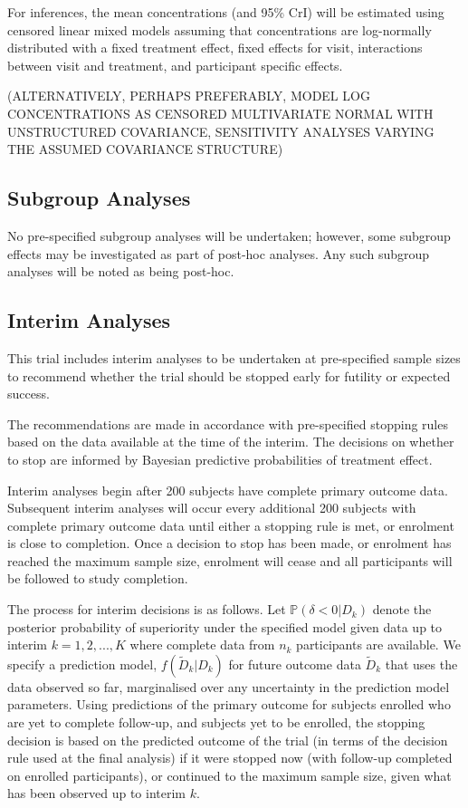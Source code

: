 \documentclass{bmcart}
\begin{document}
For inferences, the mean concentrations (and 95\% CrI) will be estimated using censored linear mixed models assuming that concentrations are log-normally distributed with a fixed treatment effect, fixed effects for visit, interactions between visit and treatment, and participant specific effects.

(ALTERNATIVELY, PERHAPS PREFERABLY, MODEL LOG CONCENTRATIONS AS CENSORED MULTIVARIATE NORMAL WITH UNSTRUCTURED COVARIANCE, SENSITIVITY ANALYSES VARYING THE ASSUMED COVARIANCE STRUCTURE)


\subsection*{Subgroup Analyses}

No pre-specified subgroup analyses will be undertaken; however, some subgroup effects may be investigated as part of post-hoc analyses.
Any such subgroup analyses will be noted as being post-hoc.

\subsection*{Interim Analyses}

This trial includes interim analyses to be undertaken at pre-specified sample sizes to recommend whether the trial should be stopped early for futility or expected success.

The recommendations are made in accordance with pre-specified stopping rules based on the data available at the time of the interim.
The decisions on whether to stop are informed by Bayesian predictive probabilities of treatment effect.

Interim analyses begin after 200 subjects have complete primary outcome data.
Subsequent interim analyses will occur every additional 200 subjects with complete primary outcome data until either a stopping rule is met, or enrolment is close to completion.
Once a decision to stop has been made, or enrolment has reached the maximum sample size, enrolment will cease and all participants will be followed to study completion.

The process for interim decisions is as follows.
Let $\mathbb P(\delta < 0|D_k)$ denote the posterior probability of superiority under the specified model given data up to interim $k=1,2,...,K$ where complete data from $n_k$ participants are available.
We specify a prediction model, $f(\tilde D_k|D_k)$ for future outcome data $\tilde D_k$ that uses the data observed so far, marginalised over any uncertainty in the prediction model parameters.
Using predictions of the primary outcome for subjects enrolled who are yet to complete follow-up, and subjects yet to be enrolled, the stopping decision is based on the predicted outcome of the trial (in terms of the decision rule used at the final analysis) if it were stopped now (with follow-up completed on enrolled participants), or continued to the maximum sample size, given what has been observed up to interim $k$.
\end{document}
